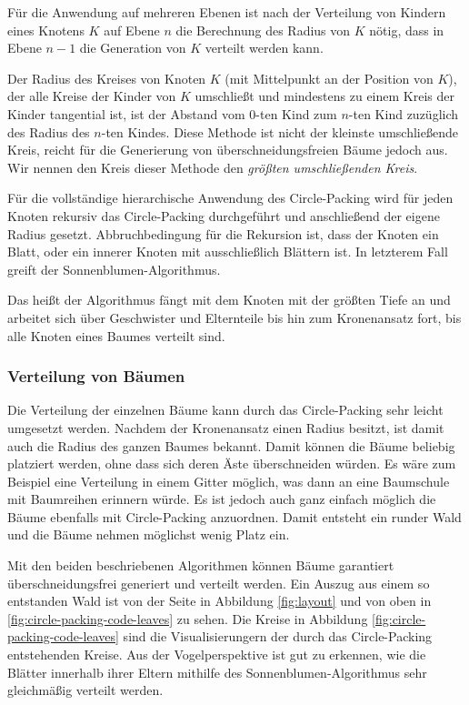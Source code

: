 Für die Anwendung auf mehreren Ebenen ist nach der Verteilung von Kindern eines Knotens $K$ auf Ebene $n$ die Berechnung des Radius von $K$ nötig, dass in Ebene $n - 1$ die Generation von $K$ verteilt werden kann.

Der Radius des Kreises von Knoten $K$ (mit Mittelpunkt an der Position von $K$), der alle Kreise der Kinder von $K$ umschließt und mindestens zu einem Kreis der Kinder tangential ist, ist der Abstand vom $0$-ten Kind zum $n$-ten Kind zuzüglich des Radius des $n$-ten Kindes. Diese Methode ist nicht der kleinste umschließende Kreis, reicht für die Generierung von überschneidungsfreien Bäume jedoch aus. Wir nennen den Kreis dieser Methode den \textit{größten umschließenden Kreis}.

Für die vollständige hierarchische Anwendung des Circle-Packing wird für jeden Knoten rekursiv das Circle-Packing durchgeführt und anschließend der eigene Radius gesetzt. Abbruchbedingung für die Rekursion ist, dass der Knoten ein Blatt, oder ein innerer Knoten mit ausschließlich Blättern ist. In letzterem Fall greift der Sonnenblumen-Algorithmus.

Das heißt der Algorithmus fängt mit dem Knoten mit der größten Tiefe an und arbeitet sich über Geschwister und Elternteile bis hin zum Kronenansatz fort, bis alle Knoten eines Baumes verteilt sind.

\subsubsection*{Verteilung von Bäumen}

Die Verteilung der einzelnen Bäume kann durch das Circle-Packing sehr leicht umgesetzt werden. Nachdem der Kronenansatz einen Radius besitzt, ist damit auch die Radius des ganzen Baumes bekannt. Damit können die Bäume beliebig platziert werden, ohne dass sich deren Äste überschneiden würden. Es wäre zum Beispiel eine Verteilung in einem Gitter möglich, was dann an eine Baumschule mit Baumreihen erinnern würde. Es ist jedoch auch ganz einfach möglich die Bäume ebenfalls mit Circle-Packing anzuordnen. Damit entsteht ein runder Wald und die Bäume nehmen möglichst wenig Platz ein.

Mit den beiden beschriebenen Algorithmen können Bäume garantiert überschneidungsfrei generiert und verteilt werden. Ein Auszug aus einem so entstanden Wald ist von der Seite in Abbildung \ref{fig:layout} und von oben in \ref{fig:circle-packing-code-leaves} zu sehen. Die Kreise in Abbildung \ref{fig:circle-packing-code-leaves} sind die Visualisierungern der durch das Circle-Packing entstehenden Kreise. Aus der Vogelperspektive ist gut zu erkennen, wie die Blätter innerhalb ihrer Eltern mithilfe des Sonnenblumen-Algorithmus sehr gleichmäßig verteilt werden.

